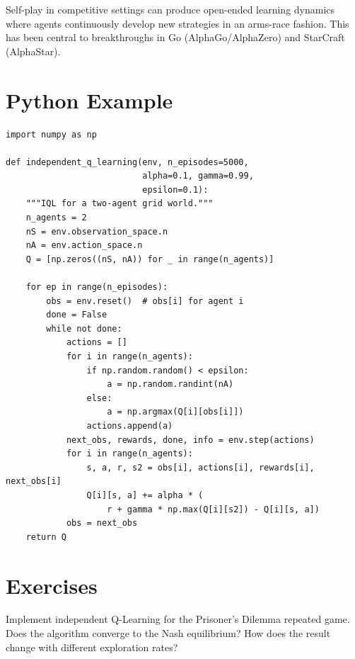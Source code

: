 \begin{remark}
Self-play in competitive settings can produce open-ended learning
dynamics where agents continuously develop new strategies in an
arms-race fashion. This has been central to breakthroughs in Go
(AlphaGo/AlphaZero) and StarCraft (AlphaStar).
\end{remark}

\section{Python Example}
\label{sec:marl:code}

\begin{codeblock}[title=\textbf{Independent Q-Learning for Two Agents}]
\begin{verbatim}
import numpy as np

def independent_q_learning(env, n_episodes=5000,
                           alpha=0.1, gamma=0.99,
                           epsilon=0.1):
    """IQL for a two-agent grid world."""
    n_agents = 2
    nS = env.observation_space.n
    nA = env.action_space.n
    Q = [np.zeros((nS, nA)) for _ in range(n_agents)]

    for ep in range(n_episodes):
        obs = env.reset()  # obs[i] for agent i
        done = False
        while not done:
            actions = []
            for i in range(n_agents):
                if np.random.random() < epsilon:
                    a = np.random.randint(nA)
                else:
                    a = np.argmax(Q[i][obs[i]])
                actions.append(a)
            next_obs, rewards, done, info = env.step(actions)
            for i in range(n_agents):
                s, a, r, s2 = obs[i], actions[i], rewards[i], next_obs[i]
                Q[i][s, a] += alpha * (
                    r + gamma * np.max(Q[i][s2]) - Q[i][s, a])
            obs = next_obs
    return Q
\end{verbatim}
\end{codeblock}

\section{Exercises}
\label{sec:marl:exercises}

\begin{exercise}
Implement independent Q-Learning for the Prisoner's Dilemma repeated
game. Does the algorithm converge to the Nash equilibrium? How does
the result change with different exploration rates?
\end{exercise}

